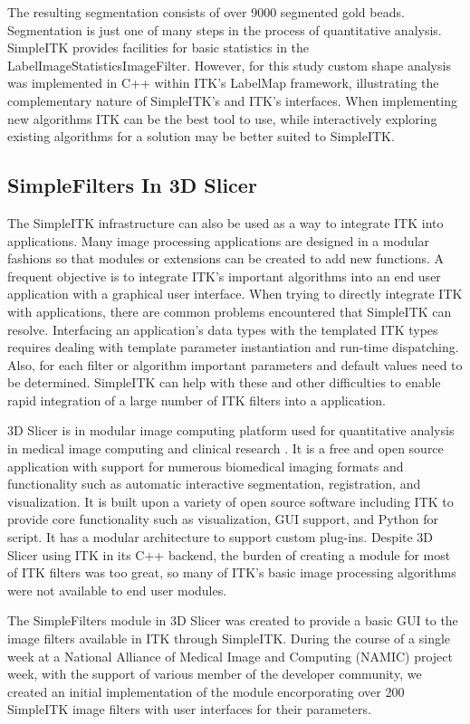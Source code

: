 \documentclass{frontiersMED} %
\begin{document}
The resulting segmentation consists of over 9000 segmented gold
beads. Segmentation is just one of many steps in the process of
quantitative analysis. SimpleITK provides facilities for basic
statistics in the LabelImageStatisticsImageFilter. However, for this
study custom shape analysis was implemented in C++
within ITK’s LabelMap framework, illustrating the complementary
nature of SimpleITK's and ITK's interfaces. When implementing new
algorithms ITK can be the best tool to use, while interactively
exploring existing algorithms for a solution may be better suited to
SimpleITK. 

\subsection{SimpleFilters In 3D Slicer}
The SimpleITK infrastructure can also be used as a way to integrate
ITK into applications. Many image processing applications are designed
in a modular fashions so that modules or extensions can be created to
add new functions. A frequent objective is to integrate ITK’s
important algorithms into an end user application with a graphical
user interface. When trying to directly integrate ITK with
applications, there are common problems encountered that SimpleITK can
resolve.  Interfacing an application's data types with
the templated ITK types requires dealing with template parameter
instantiation and run-time dispatching. Also, for each filter or algorithm
important parameters and default values need to be
determined. SimpleITK can help with these and other difficulties to
enable rapid integration of a large number of ITK filters into a
application. 

3D Slicer is in modular image computing platform used for quantitative
analysis in medical image computing and clinical research
\cite{Fedorov2012}. It is a free and open source application with support
for numerous biomedical imaging formats and functionality such as
automatic interactive segmentation, registration, and
visualization. It is built upon a variety of open source software
including ITK to provide core functionality such as visualization, GUI
support, and Python for script. It has a modular
architecture to support custom plug-ins. Despite 3D Slicer using ITK
in its C++ backend, the burden of creating a module for most of ITK
filters was too great, so many of ITK's basic image processing algorithms
were not available to end user modules.

The SimpleFilters module in 3D Slicer was created to provide a basic
GUI to the image filters available in ITK through SimpleITK. During
the course of a single week at a National Alliance of Medical Image
and Computing (NAMIC) project week, with the support of various member
of the developer community, we created an initial implementation of the module
encorporating over 200 SimpleITK image filters with user interfaces
for their parameters. 
\end{document}
